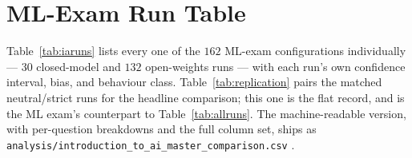 \section{ML-Exam Run Table}
\label{app:iaruns}

Table~\ref{tab:iaruns} lists every one of the $162$ ML-exam configurations individually --- $30$ closed-model and $132$ open-weights runs --- with each run's own confidence interval, bias, and behaviour class. Table~\ref{tab:replication} pairs the matched neutral/strict runs for the headline comparison; this one is the flat record, and is the ML exam's counterpart to Table~\ref{tab:allruns}. The machine-readable version, with per-question breakdowns and the full column set, ships as \texttt{analysis/introduction\_to\_ai\_master\_comparison.csv} \artifactsin.


